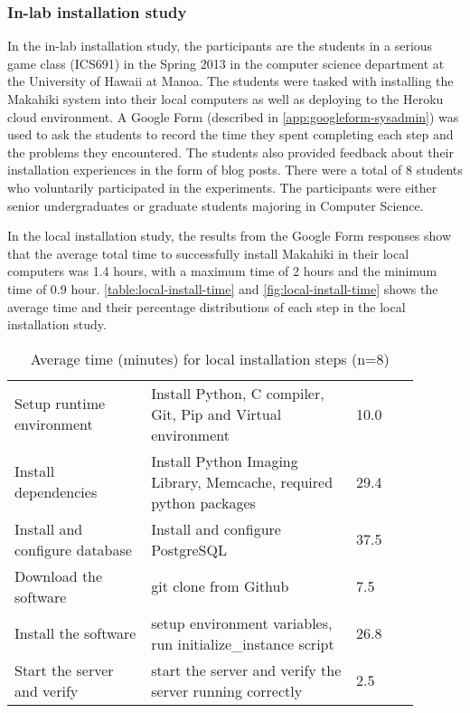 \subsubsection{In-lab installation study}
\label{sec:sysadmin-in-lab-result}

In the in-lab installation study, the participants are the students in a serious game class (ICS691) in the Spring 2013 in the computer science department at the University of Hawaii at Manoa. The students were tasked with installing the Makahiki system into their local computers as well as deploying to the Heroku cloud environment. A Google Form (described in \autoref{app:googleform-sysadmin}) was used to ask the students to record the time they spent completing each step and the problems they encountered. The students also provided feedback about their installation experiences in the form of blog posts. There were a total of 8 students who voluntarily participated in the experiments.  The participants were either senior undergraduates or graduate students majoring in Computer Science. 

In the local installation study, the results from the Google Form responses show that the average total time to successfully install Makahiki in their local computers was 1.4 hours, with a maximum time of 2 hours and the minimum time of 0.9 hour. \autoref{table:local-install-time} and \autoref{fig:local-install-time} shows the average time and their percentage distributions of each step in the local installation study.

\begin{table}[ht!]
  \centering
  \begin{tabular}{|p{0.3\linewidth}|P{0.45\linewidth}|P{0.14\linewidth}|}
    \hline
     &  &  \\
    \hline
    Setup runtime environment & Install Python, C compiler, Git, Pip and Virtual environment & 10.0 \\
    \hline
    Install dependencies & Install Python Imaging Library, Memcache, required python packages & 29.4 \\
    \hline
    Install and configure database & Install and configure PostgreSQL & 37.5 \\
    \hline
    Download the software & git clone from Github & 7.5 \\
    \hline
    Install the software & setup environment variables, run initialize\_instance script & 26.8 \\
    \hline
    Start the server and verify & start the server and verify the server running correctly & 2.5 \\
   \hline
    \end{tabular}
  \caption{Average time (minutes) for local installation steps (n=8)}
  \label{table:local-install-time}
\end{table}
    
